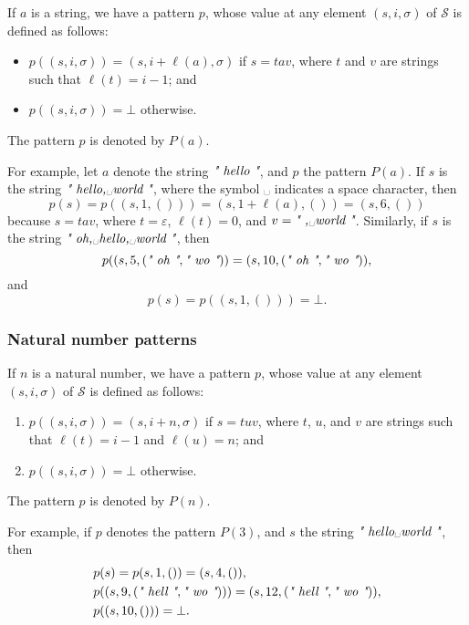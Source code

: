\documentclass{article}
\begin{document}
If \(a\) is a string, we have a pattern \(p\), whose value at any
element \((s, i, \sigma)\) of \(\mathcal{S}\) is defined as follows:
\begin{itemize}
\item \(p((s, i, \sigma)) = (s, i + \ell(a), \sigma)\) if \(s = tav\),
  where \(t\) and \(v\) are strings such that \(\ell(t) = i - 1\); and
\item \(p((s, i, \sigma)) = \bot\) otherwise.
\end{itemize}
The pattern \(p\) is denoted by \(P(a)\).

For example, let \(a\) denote the string \(\text{\itshape" hello "}\), and \(p\)
the pattern \(P(a)\).  If \(s\) is the string \(\text{\itshape" hello,␣world "}\),
where the symbol ␣ indicates a space character, then
\begin{displaymath}
  p(s) =
  p((s, 1, ())) =
  (s, 1 + \ell(a), ()) =
  (s, 6, ())
\end{displaymath}
because \(s = tav\), where \(t = \varepsilon\), \(\ell(t) = 0\), and
\(v = \text{\itshape" ,␣world "}\).  Similarly, if \(s\) is the string
\(\text{\itshape" oh,␣hello,␣world "}\), then
\begin{displaymath}
  p((s, 5, (\text{\itshape" oh "}, \text{\itshape" wo "})) = (s, 10, (\text{\itshape" oh "}, \text{\itshape" wo "})),
\end{displaymath}
and
\begin{displaymath}
  p(s) = p((s, 1, ())) = \bot.
\end{displaymath}

\subsubsection{Natural number patterns}
\label{sec:amrbrlnv}

If \(n\) is a natural number, we have a pattern \(p\), whose value at
any element \((s, i, \sigma)\) of \(\mathcal{S}\) is defined as
follows:
\begin{enumerate}
\item \(p((s, i, \sigma)) = (s, i + n, \sigma)\) if \(s = tuv\), where
  \(t\), \(u\), and \(v\) are strings such that \(\ell(t) = i - 1\)
  and \(\ell(u) = n\); and
\item \(p((s, i, \sigma)) = \bot\) otherwise.
\end{enumerate}
The pattern \(p\) is denoted by \(P(n)\).

For example, if \(p\) denotes the pattern \(P(3)\), and \(s\) the
string \(\text{\itshape" \text{hello␣world} "}\), then
\begin{align*}
  &p(s) = p(s, 1, ()) = (s, 4, ()), \\
  &p((s, 9, (\text{\itshape" hell "}, \text{\itshape" wo "}))) =
    (s, 12, (\text{\itshape" hell "}, \text{\itshape" wo "})), \\
  &p((s, 10, ())) = \bot.
\end{align*}
\end{document}
